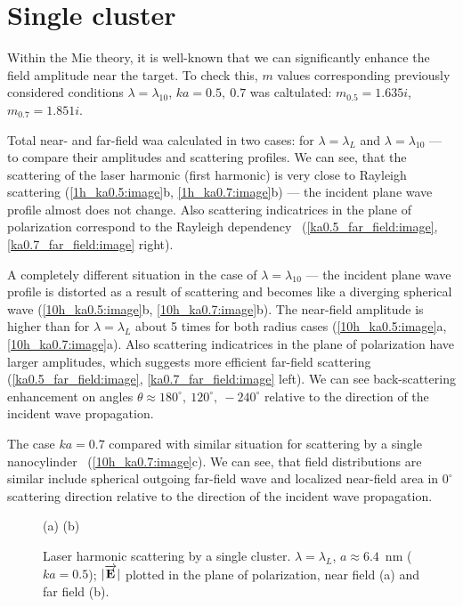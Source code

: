 \section{Single cluster}

Within the Mie theory, it is well-known that we can significantly enhance the field amplitude near the target. To check this, $m$ values corresponding previously considered conditions $\lambda = \lambda_{10}$, $ka = 0.5,\:0.7$ was caltulated: $m_{0.5} = 1.635i$, $m_{0.7} = 1.851i$.

Total near- and far-field waa calculated in two cases: for $\lambda = \lambda_{L}$ and $\lambda = \lambda_{10}$ --- to compare their amplitudes and scattering profiles. We can see, that the scattering of the laser harmonic (first harmonic) is very close to Rayleigh scattering (\autoref{1h_ka0.5:image}b, \ref{1h_ka0.7:image}b) --- the incident plane wave profile almost does not change. Also scattering indicatrices in the plane of polarization correspond to the Rayleigh dependency~\cite{boren_huffman} (\autoref{ka0.5_far_field:image}, \ref{ka0.7_far_field:image} right).

A completely different situation in the case of $\lambda = \lambda_{10}$ --- the incident plane wave profile is distorted as a result of scattering and becomes like a diverging spherical wave (\autoref{10h_ka0.5:image}b, \ref{10h_ka0.7:image}b). The near-field amplitude is higher than for $\lambda = \lambda_{L}$ about 5 times for both radius cases (\autoref{10h_ka0.5:image}a, \ref{10h_ka0.7:image}a). Also scattering indicatrices in the plane of polarization have larger amplitudes, which suggests more efficient far-field scattering (\autoref{ka0.5_far_field:image}, \ref{ka0.7_far_field:image} left). We can see back-scattering enhancement on angles $\theta \approx 180^{\circ},\:120^{\circ},\:-240^{\circ}$ relative to the direction of the incident wave propagation.

The case $ka = 0.7$ compared with similar situation for scattering by a single nanocylinder~\cite{andreev_lecz} (\autoref{10h_ka0.7:image}c). We can see, that field distributions are similar include spherical outgoing far-field wave and localized near-field area in $0^{\circ}$ scattering direction relative to the direction of the incident wave propagation.

    \begin{figure}[H]
        (a)\:
        (b)\:
        \caption{Laser harmonic scattering by a single cluster. $\lambda = \lambda_{L}$, $a \approx 6.4$~nm ($ka = 0.5$); $|\overrightarrow{\textbf{E}_{}}|$ plotted in the plane of polarization, near field (a) and far field (b).}
        \label{1h_ka0.5:image}
    \end{figure}


